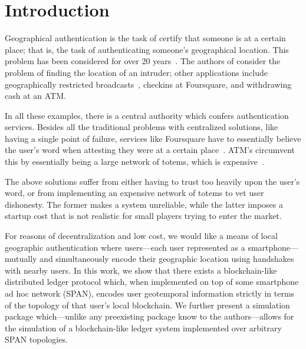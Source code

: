 \section{Introduction}

Geographical authentication
is the task of certify that someone is at a certain place;
that is,
the task of authenticating someone's geographical location.
This problem has been considered for over 20 years~\cite{denning_1996}.
The authors of \cite{denning_1996} consider the problem of finding
the location of an intruder;
other applications include geographically restricted broadcasts~\cite{gdpr},
checkins at Foursquare,
and withdrawing cash at an ATM.

In all these examples,
there is a central authority which confers authentication services.
Besides all the traditional problems with centralized solutions,
like having a single point of failure,
services like Foursquare have to essentially believe the user's word
when attesting they were at a certain place~\cite{glas2015breaking}.
ATM's circumvent this by essentially being a large network of totems,
which is expensive~\cite{totem_patent}.

The above solutions suffer from either having to trust too heavily upon
the user's word, or from implementing an expensive network of totems to
vet user dishonesty. The former makes a system unreliable, while the latter
imposes a startup cost that is not realistic for small players trying to enter
the market.

For reasons of decentralization and low cost, we would like a
means of local geographic authentication where users---each user represented as
a smartphone---mutually and simultaneously encode their geographic location using
handshakes with nearby users. In this work, we show that there exists a
blockchain-like distributed ledger protocol which, when implemented on top of some
smartphone ad hoc network (SPAN), encodes user geotemporal information strictly in
terms of the topology of that user's local blockchain. We further present a simulation
package which---unlike any preexisting package know to the authors---allows for the
simulation of a blockchain-like ledger system implemented over arbitrary SPAN
topologies.
